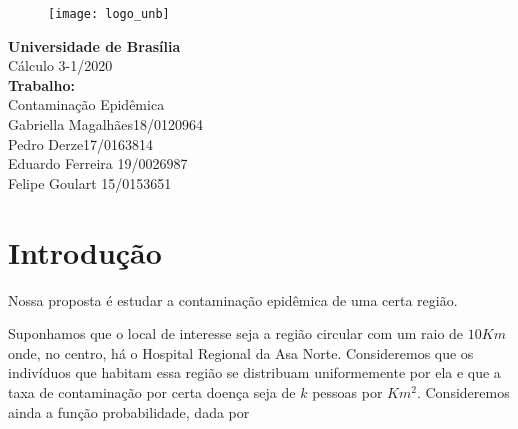 \documentclass[a4paper]{article}
\begin{document}
\begin{titlepage}
	\begin{center}		
	\begin{figure}[htb!]
			\begin{flushleft}
			\texttt{[image: logo\_unb]}
			\end{flushleft}
\end{figure}
        \vspace{-2.5cm}
        \hspace{2.1cm}\Large{\textbf{Universidade de Brasília}}\\
        \hspace{2.1cm}\Large{Cálculo 3-1/2020}\\
        \vspace{200pt}
        \LARGE{\textbf{Trabalho:}}\\ 
        \Large{Contaminação Epidêmica}\\
        \vspace{150pt}
        \vspace{40pt}
        \hfill Gabriella Magalhães\hspace{20pt}18/0120964\\
        \hfill Pedro Derze\hspace{20pt}17/0163814  \\
        \hfill Eduardo Ferreira \hspace{20pt}19/0026987\\
        \hfill Felipe Goulart \hspace{20pt}15/0153651 
       \vspace{\fill}

	\end{center}
\end{titlepage}
\newpage
\LARGE{\section{Introdução}}

Nossa proposta é estudar a contaminação epidêmica de uma certa região.\newline

Suponhamos que o local de interesse seja a região circular com um raio de $10Km$ onde, no centro, há o Hospital Regional da Asa Norte. Consideremos que os indivíduos que habitam essa região se distribuam uniformemente por ela e que a taxa de contaminação por certa doença seja de $k$ pessoas por $Km^2$. Consideremos ainda a função probabilidade, dada por\newline
\end{document}
